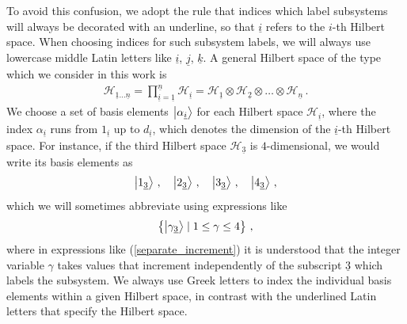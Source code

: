 \documentclass[12pt]{article}
\newcommand{\ul}[1]{{\underline{#1}}}
\numberwithin{equation}{section}
\begin{document}
To avoid this confusion, we adopt the rule that indices which label subsystems will always be decorated with an underline, so that $\ul{i}$ refers to the $i$-th Hilbert space. When choosing indices for such subsystem labels, we will always use lowercase middle Latin letters like $\ul{i}$, $\ul{j}$, $\ul{k}$. A general Hilbert space of the type which we consider in this work is
%
\begin{align}
    \mathcal{H}_{\ul{1} \ldots \ul{n}} = \prod_{\ul{i} = \ul{1}}^{\ul{n}} \mathcal{H}_{\ul{i}} = \mathcal{H}_{\ul{1}} \otimes \mathcal{H}_{\ul{2}} \otimes \ldots \otimes \mathcal{H}_{\ul{n}} \, .
\end{align}
%
We choose a set of basis elements $\ket{ \alpha_\ul{i} }$ for each Hilbert space $\mathcal{H}_\ul{i}$, where the index $\alpha_{\ul{i}}$ runs from $1_{\ul{i}}$ up to $d_{\ul{i}}$, which denotes the dimension of the $\ul{i}$-th Hilbert space. For instance, if the third Hilbert space $\mathcal{H}_{\ul{3}}$ is $4$-dimensional, we would write its basis elements as
%
\begin{align}
    \ket{ 1_{\ul{3 } } } \, , \quad \ket{ 2_{\ul{3 } } } \, , \quad \ket{ 3_{\ul{3 } } } \, , \quad \ket{ 4_{\ul{3 } } } \, ,
\end{align}
%
which we will sometimes abbreviate using expressions like
%
\begin{align}\label{separate_increment}
    \left\{ \ket{\gamma_{\ul{3}}} \mid 1 \leq \gamma \leq 4 \right\} \, ,
\end{align}
%
where in expressions like (\ref{separate_increment}) it is understood that the integer variable $\gamma$ takes values that increment independently of the subscript $\ul{3}$ which labels the subsystem.  We always use Greek letters to index the individual basis elements within a given Hilbert space, in contrast with the underlined Latin letters that specify the Hilbert space.
\end{document}

